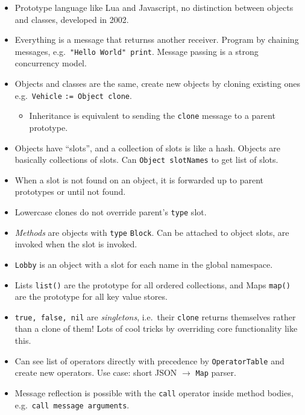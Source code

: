 \documentclass[10pt]{article}
\begin{document}
\begin{itemize}
    \item Prototype language like Lua and Javascript, no distinction between
        objects and classes, developed in 2002.
    \item Everything is a message that returnss another receiver. Program by
        chaining messages, e.g.\ \lstinline{"Hello World" print}. Message passing
        is a strong concurrency model.
    \item Objects and classes are the same, create new objects by cloning
        existing ones e.g.\ \lstinline{Vehicle} \lstinline{:= Object clone}.
        \begin{itemize}
            \item Inheritance is equivalent to sending the \lstinline{clone}
                message to a parent prototype.
        \end{itemize}
    \item Objects have ``slots'', and a collection of slots is like a hash.
        Objects are basically collections of slots. Can
        \lstinline{Object slotNames} to get list of slots.
    \item When a slot is not found on an object, it is forwarded up to parent
        prototypes or until not found.
    \item Lowercase clones do not override parent's \lstinline{type} slot.
    \item \emph{Methods} are objects with \lstinline{type} \lstinline{Block}. Can be
        attached to object slots, are invoked when the slot is invoked.
    \item \lstinline{Lobby} is an object with a slot for each name in the global
        namespace.
    \item Lists \lstinline{list()} are the prototype for all ordered collections,
        and Maps \lstinline{map()} are the prototype for all key value stores.
    \item \lstinline{true, false, nil} are \emph{singletons}, i.e.\ their
        \lstinline{clone} returns themselves rather than a clone of them! Lots of
        cool tricks by overriding core functionality like this.
    \item Can see list of operators directly with precedence by
        \lstinline{OperatorTable} and create new operators. Use case: short JSON
        $\to$ \lstinline{Map} parser.
    \item Message reflection is possible with the \lstinline{call} operator inside
        method bodies, e.g.\ \lstinline{call message arguments}.

\end{itemize}
\end{document}
